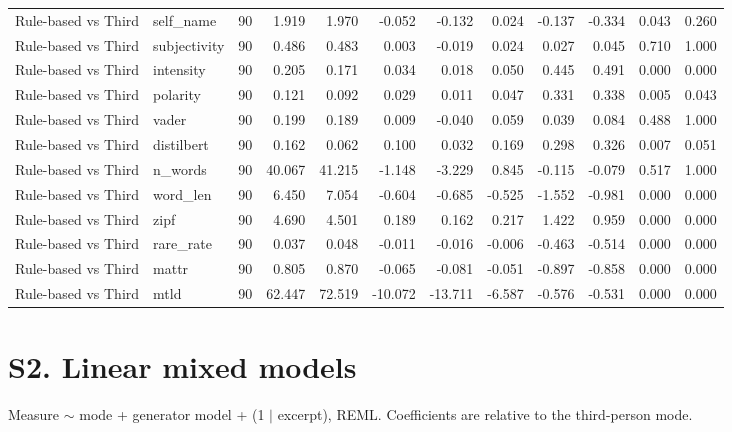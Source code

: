 \documentclass[10pt]{article}
\begin{document}
{\begin{longtable}{llrrrrrrrrrr}
Rule-based vs Third & self\_name & 90 & 1.919 & 1.970 & -0.052 & -0.132 & 0.024 & -0.137 & -0.334 & 0.043 & 0.260 \\
Rule-based vs Third & subjectivity & 90 & 0.486 & 0.483 & 0.003 & -0.019 & 0.024 & 0.027 & 0.045 & 0.710 & 1.000 \\
Rule-based vs Third & intensity & 90 & 0.205 & 0.171 & 0.034 & 0.018 & 0.050 & 0.445 & 0.491 & 0.000 & 0.000 \\
Rule-based vs Third & polarity & 90 & 0.121 & 0.092 & 0.029 & 0.011 & 0.047 & 0.331 & 0.338 & 0.005 & 0.043 \\
Rule-based vs Third & vader & 90 & 0.199 & 0.189 & 0.009 & -0.040 & 0.059 & 0.039 & 0.084 & 0.488 & 1.000 \\
Rule-based vs Third & distilbert & 90 & 0.162 & 0.062 & 0.100 & 0.032 & 0.169 & 0.298 & 0.326 & 0.007 & 0.051 \\
Rule-based vs Third & n\_words & 90 & 40.067 & 41.215 & -1.148 & -3.229 & 0.845 & -0.115 & -0.079 & 0.517 & 1.000 \\
Rule-based vs Third & word\_len & 90 & 6.450 & 7.054 & -0.604 & -0.685 & -0.525 & -1.552 & -0.981 & 0.000 & 0.000 \\
Rule-based vs Third & zipf & 90 & 4.690 & 4.501 & 0.189 & 0.162 & 0.217 & 1.422 & 0.959 & 0.000 & 0.000 \\
Rule-based vs Third & rare\_rate & 90 & 0.037 & 0.048 & -0.011 & -0.016 & -0.006 & -0.463 & -0.514 & 0.000 & 0.000 \\
Rule-based vs Third & mattr & 90 & 0.805 & 0.870 & -0.065 & -0.081 & -0.051 & -0.897 & -0.858 & 0.000 & 0.000 \\
Rule-based vs Third & mtld & 90 & 62.447 & 72.519 & -10.072 & -13.711 & -6.587 & -0.576 & -0.531 & 0.000 & 0.000 \\
\bottomrule
\end{longtable}
}


\section*{S2. Linear mixed models}

Measure $\sim$ mode + generator model + (1 $|$ excerpt), REML. Coefficients are relative to the third-person mode.
\end{document}

